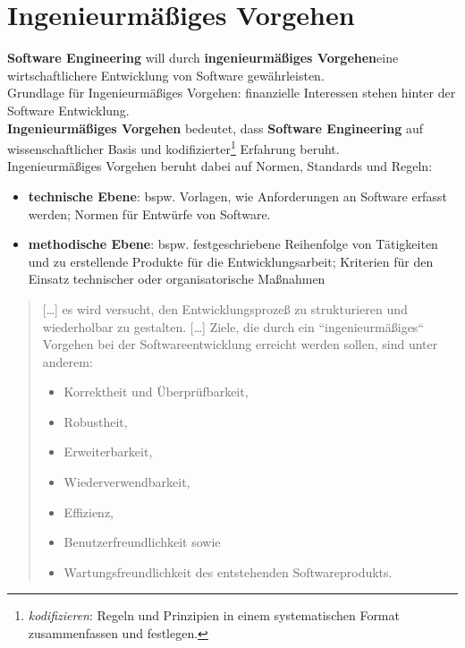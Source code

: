\section{Ingenieurmäßiges Vorgehen}

\begin{tcolorbox}[title=Ingenieurmäßiges Vorgehen]
\textbf{Software Engineering} will durch \textbf{ingenieurmäßiges Vorgehen}eine wirtschaftlichere Entwicklung von Software gewährleisten.\\
Grundlage für Ingenieurmäßiges Vorgehen: finanzielle Interessen stehen hinter der Software Entwicklung.\\

\noindent
\textbf{Ingenieurmäßiges Vorgehen} bedeutet, dass \textbf{Software Engineering} auf wissenschaftlicher Basis und kodifizierter\footnote{
    \textit{kodifizieren}: Regeln und Prinzipien in einem systematischen Format zusammenfassen und festlegen.
} Erfahrung beruht.\\

\noindent
Ingenieurmäßiges Vorgehen beruht dabei auf Normen, Standards und Regeln:

\begin{itemize}
    \item\textbf{technische Ebene}: bspw. Vorlagen, wie Anforderungen an Software erfasst werden; Normen für Entwürfe von Software.
    \item \textbf{methodische Ebene}: bspw. festgeschriebene Reihenfolge von Tätigkeiten und zu erstellende Produkte für die Entwicklungsarbeit; Kriterien für den Einsatz technischer oder organisatorische Maßnahmen
\end{itemize}
\end{tcolorbox}


\begin{tcolorbox}[title=Ziele des Ingenieurmäßigen Vorgehens]
\blockquote[{\cite[2]{SR94}}]{
[\ldots] es wird versucht, den
Entwicklungsprozeß zu strukturieren und wiederholbar zu gestalten.
[\ldots]
Ziele, die durch ein ``ingenieurmäßiges`` Vorgehen bei der Softwareentwicklung erreicht werden sollen, sind unter anderem:
\begin{itemize}
    \item Korrektheit und Überprüfbarkeit,
    \item  Robustheit,
    \item  Erweiterbarkeit,
    \item  Wiederverwendbarkeit,
    \item  Effizienz,
    \item  Benutzerfreundlichkeit sowie
    \item  Wartungsfreundlichkeit des entstehenden Softwareprodukts.
\end{itemize}
}
\end{tcolorbox}